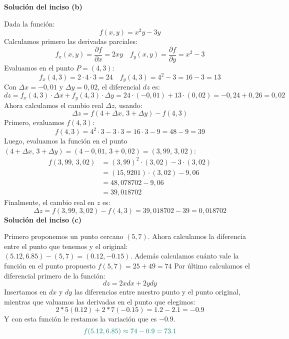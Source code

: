 \documentclass{article}
\begin{document}
\bigskip %
\noindent\textbf{Solución del inciso (b)}

Dada la función:
\[
f(x,y) = x^2 y - 3y
\]
Calculamos primero las derivadas parciales:
\[
f_x(x,y) = \frac{\partial f}{\partial x} = 2xy \quad f_y(x,y) = \frac{\partial f}{\partial y} = x^2 - 3
\]
Evaluamos en el punto \(P = (4,3)\):
\[
f_x(4,3) = 2 \cdot 4 \cdot 3 = 24 \quad f_y(4,3) = 4^2 - 3 = 16 - 3 = 13
\]
Con \(\Delta x = -0{,}01\) y \(\Delta y = 0{,}02\), el diferencial \(dz\) es:
{\color{teal}
\[
dz = f_x(4,3) \cdot \Delta x + f_y(4,3) \cdot \Delta y = 24 \cdot (-0{,}01) + 13 \cdot (0{,}02) = -0{,}24 + 0{,}26 = 0{,}02
\]
} %
Ahora calculamos el cambio real \(\Delta z\), usando:
\[
\Delta z = f(4 + \Delta x,\, 3 + \Delta y) - f(4,3)
\]
Primero, evaluamos \(f(4,3)\):
\[
f(4,3) = 4^2 \cdot 3 - 3 \cdot 3 = 16 \cdot 3 - 9 = 48 - 9 = 39
\]
Luego, evaluamos la función en el punto \((4+\Delta x,\, 3+\Delta y)=(4-0{,}01,\, 3+0{,}02)=(3{,}99,\,3{,}02)\):
\[
\begin{split}
f(3{,}99,\, 3{,}02) &= (3{,}99)^2 \cdot (3{,}02) - 3 \cdot (3{,}02) \\
&= (15{,}9201) \cdot (3{,}02) - 9{,}06 \\
&= 48{,}078702 - 9{,}06 \\
&= 39{,}018702
\end{split}
\]
Finalmente, el cambio real en \(z\) es:
{\color{teal}
\[
\Delta z = f(3{,}99,\, 3{,}02) - f(4,3) = 39{,}018702 - 39 = 0{,}018702
\]
} %
\noindent\textbf{Solución del inciso (c)}

Primero proponemos un punto cercano $(5,7)$. Ahora calculamos la diferencia entre el punto que tenemos y el original: $(5.12,6.85)-(5,7)=(0.12,-0.15)$. Además calculamos cuánto vale la función en el punto propuesto $f(5,7)=25+49=74$ Por último calculamos el diferencial primero de la función:
\begin{equation*}
dz= 2x dx +2y dy
\end{equation*}
Insertamos en $dx$ y $dy$ las diferencias entre nuestro punto y el punto original, mientras que valuamos las derivadas en el punto que elegimos:
\begin{equation*}
2*5 (0.12) + 2*7 (-0.15)=1.2 -2.1= -0.9
\end{equation*}
Y con esta función le restamos la variación que es $-0.9$.
\begin{equation*}\color{teal}
f(5.12,6.85) \approx 74-0.9= \color{teal}73.1
\end{equation*}
\end{document}
